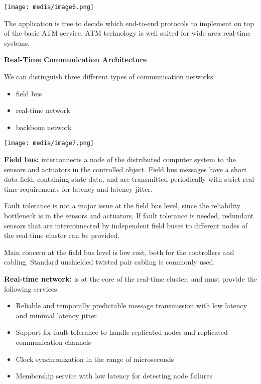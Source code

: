 \texttt{[image: media/image6.png]}

The application is free to decide which end-to-end protocols to
implement on top of the basic ATM service. ATM technology is well suited
for wide area real-time systems.

\textbf{Real-Time Communication Architecture}

We can distinguish three different types of communication networks:

\begin{itemize}
\item
  field bus
\item
  real-time network
\item
  backbone network
\end{itemize}

\texttt{[image: media/image7.png]}

\textbf{Field bus:} interconnects a node of the distributed computer
system to the sensors and actuators in the controlled object. Field bus
messages have a short data field, containing state data, and are
transmitted periodically with strict real-time requirements for latency
and latency jitter.

Fault tolerance is not a major issue at the field bus level, since the
reliability bottleneck is in the sensors and actuators. If fault
tolerance is needed, redundant sensors that are interconnected by
independent field buses to different nodes of the real-time cluster can
be provided.

Main concern at the field bus level is low cost, both for the
controllers and cabling. Standard unshielded twisted pair cabling is
commonly used.

\textbf{Real-time network:} is at the core of the real-time cluster, and
must provide the following services:

\begin{itemize}
\item
  Reliable and temporally predictable message transmission with low
  latency and minimal latency jitter
\item
  Support for fault-tolerance to handle replicated nodes and replicated
  communication channels
\item
  Clock synchronization in the range of microseconds
\item
  Membership service with low latency for detecting node failures
\end{itemize}

